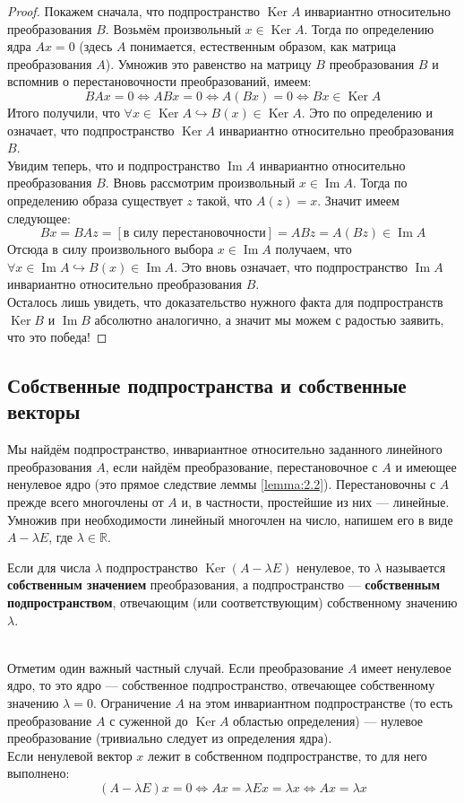 \documentclass[11pt]{article}
\DeclareMathOperator{\Imm}{Im}
\DeclareMathOperator{\Ker}{Ker}
\begin{document}
\begin{proof}
    Покажем сначала, что подпространство $\Ker A$ инвариантно относительно преобразования $B$. Возьмём произвольный $x \in \Ker A$. Тогда по определению ядра $Ax = 0$ (здесь $A$ понимается, естественным образом, как матрица преобразования $A$). Умножив это равенство на матрицу $B$ преобразования $B$ и вспомнив о перестановочности преобразований, имеем:
    \[BAx = 0 \iff ABx = 0 \iff A(Bx) = 0 \iff Bx \in \Ker A\]
    Итого получили, что $\forall x \in \Ker A \hookrightarrow B(x) \in \Ker A$. Это по определению и означает, что подпространство $\Ker A$ инвариантно относительно преобразования $B$.
    \\
    Увидим теперь, что и подпространство $\Imm A$ инвариантно относительно преобразования $B$. Вновь рассмотрим произвольный $x \in \Imm A$. Тогда по определению образа существует $z$ такой, что $A(z) = x$. Значит имеем следующее:
    \[Bx = BAz = [\text{в силу перестановочности}] = ABz = A(Bz) \in \Imm A\]
    Отсюда в силу произвольного выбора $x \in \Imm A$ получаем, что $\forall x \in \Imm A \hookrightarrow B(x) \in \Imm A$. Это вновь означает, что подпространство $\Imm A$ инвариантно относительно преобразования $B$.
    \\
    Осталось лишь увидеть, что доказательство нужного факта для подпространств $\Ker B$ и $\Imm B$ абсолютно аналогично, а значит мы можем с радостью заявить, что это победа!
\end{proof}

\subsection{Собственные подпространства и собственные векторы}

Мы найдём подпространство, инвариантное относительно заданного линейного преобразования $A$, если найдём преобразование, перестановочное с $A$ и имеющее ненулевое ядро (это прямое следствие леммы \ref{lemma:2.2}). Перестановочны с $A$ прежде всего многочлены от $A$ и, в частности, простейшие из них --- линейные. Умножив при необходимости линейный многочлен на число, напишем его в виде $A - \lambda E$, где $\lambda \in \mathbb{R}$.

\begin{definition}
    Если для числа $\lambda$ подпространство $\Ker(A - \lambda E)$ ненулевое, то $\lambda$ называется \textbf{собственным значением} преобразования, а подпространство --- \textbf{собственным подпространством}, отвечающим (или соответствующим) собственному значению $\lambda$.
\end{definition} \leavevmode
\\
Отметим один важный частный случай. Если преобразование $A$ имеет ненулевое ядро, то это ядро --- собственное подпространство, отвечающее собственному значению $\lambda = 0$. Ограничение $A$ на этом инвариантном подпространстве (то есть преобразование $A$ с суженной до $\Ker A$ областью определения) --- нулевое преобразование (тривиально следует из определения ядра). 
\\
Если ненулевой вектор $x$ лежит в собственном подпространстве, то для него выполнено:
\[(A - \lambda E)x = 0 \iff Ax = \lambda E x = \lambda x \iff Ax = \lambda x\]
\end{document}
